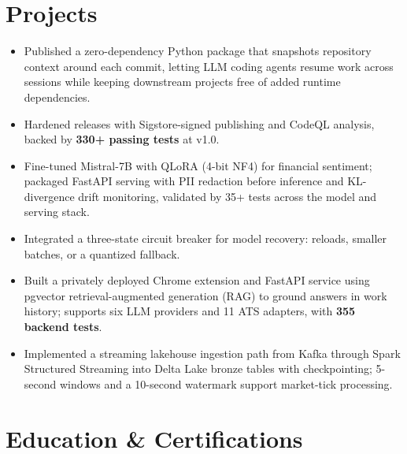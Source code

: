 \documentclass[letterpaper,10pt]{article}
\begin{document}
\section{Projects}
\begin{itemize}
\item Published a zero-dependency Python package that snapshots repository context around each commit, letting LLM coding agents resume work across sessions while keeping downstream projects free of added runtime dependencies.
\item Hardened releases with Sigstore-signed publishing and CodeQL analysis, backed by \textbf{330+ passing tests} at v1.0.
\end{itemize}
\begin{itemize}
\item Fine-tuned Mistral-7B with QLoRA (4-bit NF4) for \mbox{f}inancial sentiment; packaged FastAPI serving with PII redaction before inference and KL-divergence drift monitoring, validated by 35+ tests across the model and serving stack.
\item Integrated a three-state circuit breaker for model recovery: reloads, smaller batches, or a quantized fallback.
\end{itemize}
\begin{itemize}
\item Built a privately deployed Chrome extension and FastAPI service using pgvector retrieval-augmented generation (RAG) to ground answers in work history; supports six LLM providers and 11 ATS adapters, with \textbf{355 backend tests}.
\end{itemize}
\begin{itemize}
\item Implemented a streaming lakehouse ingestion path from Kafka through Spark Structured Streaming into Delta Lake bronze tables with checkpointing; 5-second windows and a 10-second watermark support market-tick processing.
\end{itemize}

\section{Education \& Certi\mbox{f}ications}
\vspace{3pt}
\vspace{3pt}
\vspace{3pt}
\end{document}
